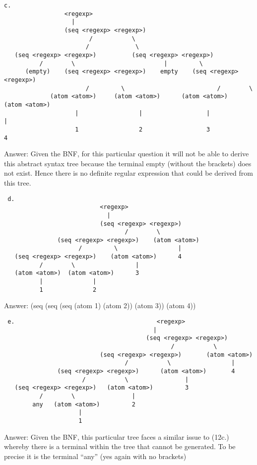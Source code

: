 \documentclass{article}
\begin{document}
\begin{lstlisting}
c.
                 <regexp>
                   |
                 (seq <regexp> <regexp>)
                        /           \
                       /             \
   (seq <regexp> <regexp>)          (seq <regexp> <regexp>)
          /        \                         |         \
      (empty)    (seq <regexp> <regexp>)    empty    (seq <regexp> <regexp>)
                       /         \                          /        \
             (atom <atom>)     (atom <atom>)      (atom <atom>)    (atom <atom>)
                    |                 |                  |                |
                    1                 2                  3                4
\end{lstlisting}
Answer: Given the BNF, for this particular question it will not be able to derive this abstract syntax tree because the terminal empty (without the brackets) does not exist. Hence there is no definite regular expression that could be derived from this tree. \linebreak

\begin{lstlisting}
 d.
                           <regexp>
                             |
                           (seq <regexp> <regexp>)
                                  /        \
               (seq <regexp> <regexp>)    (atom <atom>)
                     /         \                 |
   (seq <regexp> <regexp>)    (atom <atom>)      4
          /        \                 |
   (atom <atom>)  (atom <atom>)      3
          |              |
          1              2
\end{lstlisting}
Answer: (seq (seq (seq (atom 1) (atom 2)) (atom 3)) (atom 4))	

\begin{lstlisting}
 e.                                        <regexp>
                                          |
                                        (seq <regexp> <regexp>)
                                               /           \
                           (seq <regexp> <regexp>)       (atom <atom>)
                                  /           \                 |
               (seq <regexp> <regexp>)      (atom <atom>)       4
                      /           \                |
   (seq <regexp> <regexp>)   (atom <atom>)         3
          /        \                |
        any   (atom <atom>)         2
                     |
                     1
\end{lstlisting}
Answer: Given the BNF, this particular tree faces a similar issue to (12c.) whereby there is a terminal within the tree that cannot be generated. To be precise it is the terminal “any” (yes again with no brackets)  
\end{document}

